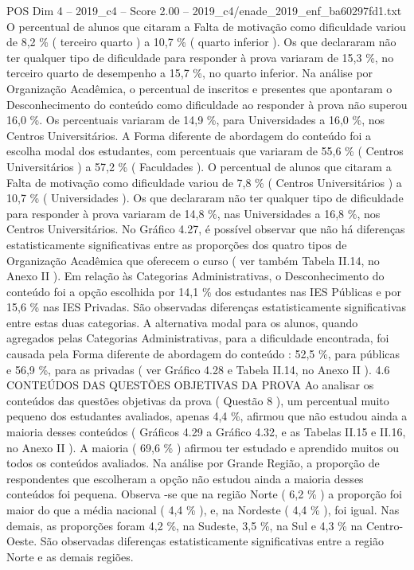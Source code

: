 \begin{textsample}{POS Dim 4 – 2019\_c4 – Score 2.00 – 2019\_c4/enade\_2019\_enf\_ba60297fd1.txt}
O percentual de alunos que citaram a Falta de motivação como dificuldade variou de 8,2 \% ( terceiro quarto ) a 10,7 \% ( quarto inferior ).
Os que declararam não ter qualquer tipo de dificuldade para responder à prova variaram de 15,3 \%, no terceiro quarto de desempenho a 15,7 \%, no quarto inferior.
Na análise por Organização Acadêmica, o percentual de inscritos e presentes que apontaram o Desconhecimento do conteúdo como dificuldade ao responder à prova não superou 16,0 \%.
Os percentuais variaram de 14,9 \%, para Universidades a 16,0 \%, nos Centros Universitários.
A Forma diferente de abordagem do conteúdo foi a escolha modal dos estudantes, com percentuais que variaram de 55,6 \% ( Centros Universitários ) a 57,2 \% ( Faculdades ).
O percentual de alunos que citaram a Falta de motivação como dificuldade variou de 7,8 \% ( Centros Universitários ) a 10,7 \% ( Universidades ).
Os que declararam não ter qualquer tipo de dificuldade para responder à prova variaram de 14,8 \%, nas Universidades a 16,8 \%, nos Centros Universitários.
No Gráfico 4.27, é possível observar que não há diferenças estatisticamente significativas entre as proporções dos quatro tipos de Organização Acadêmica que oferecem o curso ( ver também Tabela II.14, no Anexo II ).
Em relação às Categorias Administrativas, o Desconhecimento do conteúdo foi a opção escolhida por 14,1 \% dos estudantes nas IES Públicas e por 15,6 \% nas IES Privadas.
São observadas diferenças estatisticamente significativas entre estas duas categorias.
A alternativa modal para os alunos, quando agregados pelas Categorias Administrativas, para a dificuldade encontrada, foi causada pela Forma diferente de abordagem do conteúdo : 52,5 \%, para públicas e 56,9 \%, para as privadas ( ver Gráfico 4.28 e Tabela II.14, no Anexo II ). 4.6 CONTEÚDOS DAS QUESTÕES OBJETIVAS DA PROVA Ao analisar os conteúdos das questões objetivas da prova ( Questão 8 ), um percentual muito pequeno dos estudantes avaliados, apenas 4,4 \%, afirmou que não estudou ainda a maioria desses conteúdos ( Gráficos 4.29 a Gráfico 4.32, e as Tabelas II.15 e II.16, no Anexo II ).
A maioria ( 69,6 \% ) afirmou ter estudado e aprendido muitos ou todos os conteúdos avaliados.
Na análise por Grande Região, a proporção de respondentes que escolheram a opção não estudou ainda a maioria desses conteúdos foi pequena.
Observa -se que na região Norte ( 6,2 \% ) a proporção foi maior do que a média nacional ( 4,4 \% ), e, na Nordeste ( 4,4 \% ), foi igual.
Nas demais, as proporções foram 4,2 \%, na Sudeste, 3,5 \%, na Sul e 4,3 \% na Centro-Oeste.
São observadas diferenças estatisticamente significativas entre a região Norte e as demais regiões.

\end{textsample}
